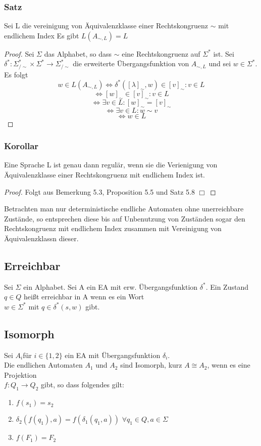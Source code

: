 \subsubsection*{Satz} Sei L die vereinigung von Äquivalenzklasse einer Rechtskongruenz $\sim$ mit endlichem Index Es gibt $L(A_{\sim, L}) = L$ 
\begin{proof}
  Sei $\Sigma$ das Alphabet, so dass $\sim$ eine Rechtskongruenz auf $\Sigma^{*}$ ist. Sei $\delta^{*} : \Sigma^{*}_{/\sim} \times \Sigma^{*} \rightarrow \Sigma^{*}_{/\sim}$ die erweiterte Übergangsfunktion von $A_{\sim, L}$ und sei $w \in \Sigma^{*}$. Es folgt 
  \[w \in L(A_{\sim, L}) \Leftrightarrow \delta^{*}([\lambda]_{\sim}, w) \in {[v]_{\sim} : v \in L}\]
  \[\Leftrightarrow [w]_{\sim} \in {[v]_{\sim} : v\in L}\]
  \[\Leftrightarrow \exists v \in L : [w]_{\sim} = [v]_{\sim}\]
  \[\Leftrightarrow \exists v \in L : w \sim v\]
  \[\Leftrightarrow w \in L\] 
\end{proof}

\subsubsection*{Korollar} Eine Sprache L ist genau dann regulär, wenn sie die Verienigung von Äquivalenzklasse einer Rechtskongruenz mit endlichem Index ist. 
\begin{proof}
  Folgt aus Bemerkung 5.3, Proposition 5.5 und Satz 5.8 $\Box$ 
\end{proof}
Betrachten man nur deterministische endliche Automaten ohne unerreichbare Zustände, so entsprechen diese bis auf Unbenutzung von Zuständen sogar den Rechtskongruenz mit endlichem Index zusammen mit Vereinigung von Äquivalenzklassn dieser.
\subsection{Erreichbar}
    Sei \(\Sigma\) ein Alphabet. Sei A ein EA mit erw. Übergangsfunktion \(\delta^*\). 
    Ein Zustand \(q\in Q\) heißt erreichbar in A wenn es ein Wort \\
    \(w\in\Sigma^*\) mit \(q\in\delta^*(s,w)\) gibt.
\subsection{Isomorph}
    Sei \(A_i\)für \(i\in\{1,2\}\) ein EA mit Übergangsfunktion \(\delta_i\).\\
    Die endlichen Automaten \(A_1\) und \(A_2\) sind Isomorph, kurz \(A\cong A_2 \), wenn es eine Projektion \\ \(f:Q_1\to Q_2\) gibt, so dass folgendes gilt:
    \begin{enumerate}
        \item \(f(s_1)=s_2\)
        \item \(\delta_2(f(q_1),a)=f(\delta_1(q_1,a))\) \(\forall q_1\in Q,a\in\Sigma\)
        \item \(f(F_1)=F_2\)
    \end{enumerate}
